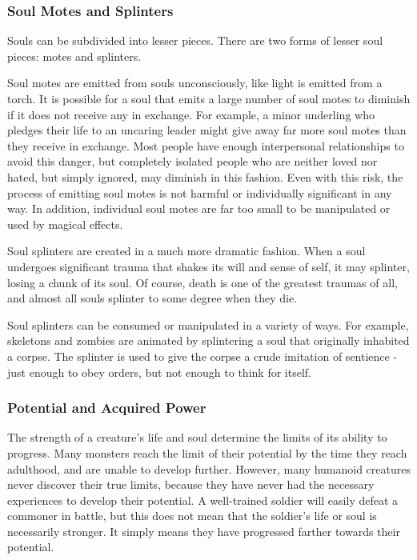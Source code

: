     \subsubsection{Soul Motes and Splinters}
      Souls can be subdivided into lesser pieces.
      There are two forms of lesser soul pieces: motes and splinters.

      Soul motes are emitted from souls unconsciously, like light is emitted from a torch.
      It is possible for a soul that emits a large number of soul motes to diminish if it does not receive any in exchange.
      For example, a minor underling who pledges their life to an uncaring leader might give away far more soul motes than they receive in exchange.
      Most people have enough interpersonal relationships to avoid this danger, but completely isolated people who are neither loved nor hated, but simply ignored, may diminish in this fashion.
      Even with this risk, the process of emitting soul motes is not harmful or individually significant in any way.
      In addition, individual soul motes are far too small to be manipulated or used by magical effects.

      Soul splinters are created in a much more dramatic fashion.
      When a soul undergoes significant trauma that shakes its will and sense of self, it may splinter, losing a chunk of its soul.
      Of course, death is one of the greatest traumas of all, and almost all souls splinter to some degree when they die.

      Soul splinters can be consumed or manipulated in a variety of ways.
      For example, skeletons and zombies are animated by splintering a soul that originally inhabited a corpse.
      The splinter is used to give the corpse a crude imitation of sentience - just enough to obey orders, but not enough to think for itself.

    \subsubsection{Potential and Acquired Power}
      The strength of a creature's life and soul determine the limits of its ability to progress.
      Many monsters reach the limit of their potential by the time they reach adulthood, and are unable to develop further.
      However, many humanoid creatures never discover their true limits, because they have never had the necessary experiences to develop their potential.
      A well-trained soldier will easily defeat a commoner in battle, but this does not mean that the soldier's life or soul is necessarily stronger.
      It simply means they have progressed farther towards their potential.

